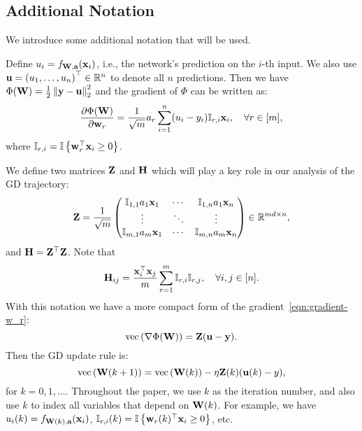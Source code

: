 \subsection{Additional Notation}
We introduce some additional notation that will be used.

Define $u_i = f_{\mathbf{W},\mathbf{a}}(\mathbf{x}_i)$, i.e., the network's prediction on the $i$-th input.
We also use $\mathbf{u} = \left({u}_1,\ldots,{u}_n\right)^\top \in \mathbb{R}^n$ to denote all $n$ predictions.
Then we have $\Phi(\mathbf{W}) = \frac12 \left\|\mathbf{y} - \mathbf{u}\right\|_2^2$ and
the gradient of $\Phi$ can be written as:
\begin{equation} \label{eqn:gradient-w_r}
\frac{\partial \Phi(\mathbf{W})}{\partial \mathbf{w}_r} = \frac{1}{\sqrt m} a_r \sum_{i=1}^n (u_i - y_i) \mathbb{I}_{r, i} \mathbf{x}_i, \quad \forall r\in[m],
\end{equation}
where $ \mathbb{I}_{r, i} = \mathbb{I} \left\{ \mathbf{w}_r^\top \mathbf{x}_i \ge 0 \right\} $.


We define two matrices $\mathbf{Z}$ and $\mathbf{H}$ which will play a key role in our analysis of the GD trajectory:
	\begin{align*}
	\mathbf{Z} = \frac{1}{\sqrt m} \begin{pmatrix}
	\mathbb{I}_{1, 1} a_1 \mathbf{x}_1 & 
	\cdots & \mathbb{I}_{1, n} a_1 \mathbf{x}_n \\
	\vdots & 
	\ddots & \vdots \\
	\mathbb{I}_{m, 1} a_m \mathbf{x}_1 & 
	\cdots & \mathbb{I}_{m, n} a_m \mathbf{x}_n
	\end{pmatrix}
		\in \mathbb{R}^{md \times n},
	\end{align*}
	and
	$
		\mathbf{H} = \mathbf{Z}^\top \mathbf{Z}
	$.
	Note that $$\mathbf{H}_{ij} = \frac{\mathbf{x}_i^\top \mathbf{x}_j}{m} \sum_{r=1}^{m}\mathbb{I}_{r,i}\mathbb{I}_{r,j}, \quad \forall i,j\in[n].$$
With this notation we have a more compact form of the gradient~\eqref{eqn:gradient-w_r}:
\begin{equation*}
\text{vec}\left(\nabla \Phi(\mathbf{W})\right) =  \mathbf{Z} (\mathbf{u} - \mathbf{y}).
\end{equation*}
Then the GD update rule is:
\begin{equation} \label{eqn:gd}
\text{vec}\left(\mathbf{W}(k+1)\right) = \text{vec}\left(\mathbf{W}(k)\right) - \eta \mathbf{Z}(k) (\mathbf{u}(k) - y),
\end{equation}
for  $k=0, 1, \ldots$.
Throughout the paper, we use $k$ as the iteration number,
and also use $k$ to index all variables that depend on $\mathbf{W}(k)$.
For example, we have $u_i(k) = f_{\mathbf{W}(k),\mathbf{a}}(\mathbf{x}_i)$, $\mathbb{I}_{r, i}(k) = \mathbb{I}\left\{ \mathbf{w}_r(k)^\top \mathbf{x}_i \ge 0 \right\}$, etc.







